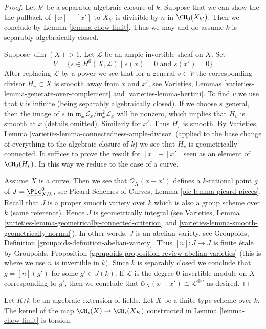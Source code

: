 \begin{proof}
Let $k'$ be a separable algebraic closure of $k$. Suppose that we can show
the the pullback of $[x] - [x']$ to $X_{k'}$ is divisible by $n$ in
$\CH_0(X_{k'})$. Then we conclude by Lemma \ref{lemma-chow-limit}.
Thus we may and do assume $k$ is separably algebraically closed.

\medskip\noindent
Suppose $\dim(X) > 1$. Let $\mathcal{L}$ be an ample invertible sheaf on $X$.
Set
$$
V = \{s \in H^0(X, \mathcal{L}) \mid s(x) = 0\text{ and }s(x') = 0 \}
$$
After replacing $\mathcal{L}$ by a power we see that for
a general $v \in V$ the corresponding divisor $H_v \subset X$ is smooth
away from $x$ and $x'$, see
Varieties, Lemmas \ref{varieties-lemma-generate-over-complement} and
\ref{varieties-lemma-bertini}. To find $v$ we use that $k$ is infinite (being
separably algebraically closed).
If we choose $s$ general, then the image of $s$ in
$\mathfrak m_x\mathcal{L}_x/\mathfrak m_x^2\mathcal{L}_x$
will be nonzero, which implies that $H_v$ is smooth at $x$
(details omitted). Similarly for $x'$. Thus $H_v$ is smooth.
By Varieties, Lemma \ref{varieties-lemma-connectedness-ample-divisor}
(applied to the base change of everything
to the algebraic closure of $k$)
we see that $H_v$ is geometrically connected.
It suffices to prove the result for
$[x] - [x']$ seen as an element of $\CH_0(H_v)$.
In this way we reduce to the case of a curve.

\medskip\noindent
Assume $X$ is a curve. Then we see that $\mathcal{O}_X(x - x')$
defines a $k$-rational point $g$ of $J = \underline{\Pic}^0_{X/k}$, see
Picard Schemes of Curves, Lemma \ref{pic-lemma-picard-pieces}.
Recall that $J$ is a proper smooth variety over $k$
which is also a group scheme over $k$ (same reference).
Hence $J$ is geometrically integral
(see Varieties, Lemma \ref{varieties-lemma-geometrically-connected-criterion}
and \ref{varieties-lemma-smooth-geometrically-normal}).
In other words, $J$ is an abelian variety, see
Groupoids, Definition \ref{groupoids-definition-abelian-variety}.
Thus $[n] : J \to J$ is finite \'etale by
Groupoids, Proposition \ref{groupoids-proposition-review-abelian-varieties}
(this is where we use $n$ is invertible in $k$).
Since $k$ is separably closed we conclude that $g = [n](g')$
for some $g' \in J(k)$. If $\mathcal{L}$ is the degree $0$
invertible module on $X$ corresponding to $g'$, then we conclude
that $\mathcal{O}_X(x - x') \cong \mathcal{L}^{\otimes n}$ as desired.
\end{proof}

\begin{lemma}
\label{lemma-kernel-to-closure}
Let $K/k$ be an algebraic extension of fields.
Let $X$ be a finite type scheme over $k$.
The kernel of the map $\CH_i(X) \to \CH_i(X_K)$
constructed in Lemma \ref{lemma-chow-limit}
is torsion.
\end{lemma}

